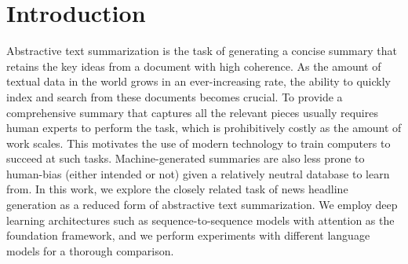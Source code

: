 \section{Introduction}

Abstractive text summarization is the task of generating a concise summary that retains the key ideas from a document with high coherence. As the amount of textual data in the world grows in an ever-increasing rate, the ability to quickly index and search from these documents becomes crucial. To provide a comprehensive summary that captures all the relevant pieces usually requires human experts to perform the task, which is prohibitively costly as the amount of work scales. This motivates the use of modern technology to train computers to succeed at such tasks. Machine-generated summaries are also less prone to human-bias (either intended or not) given a relatively neutral database to learn from. In this work, we explore the closely related task of news headline generation as a reduced form of abstractive text summarization. We employ deep learning architectures such as sequence-to-sequence models with attention as the foundation framework, and we perform experiments with different language models for a thorough comparison.